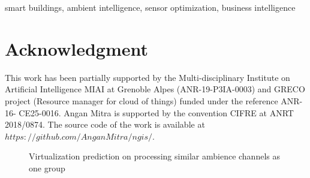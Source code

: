 \documentclass[conference]{IEEEtrans}
\begin{document}
\begin{IEEEkeywords}
smart buildings, ambient intelligence, sensor optimization, business intelligence
\end{IEEEkeywords}








\section*{Acknowledgment }
This work has been partially supported by the Multi-disciplinary Institute on Artificial Intelligence MIAI at Grenoble Alpes (ANR-19-P3IA-0003) and GRECO project (Resource manager for cloud of things) funded under the reference ANR-16- CE25-0016. Angan Mitra is supported by the convention CIFRE at ANRT 2018/0874. The source code of the work is available at $https://github.com/AnganMitra/ngis/$.





\begin{figure}%
    \centering
    \qquad
    \qquad
    \caption{Virtualization prediction on processing similar ambience channels as one group }%
    \label{fig:domainVirtualizeAmbience}%
\end{figure}
\end{document}
